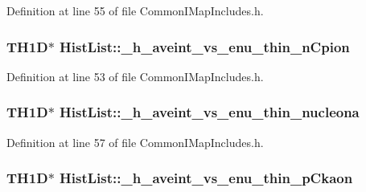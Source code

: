 Definition at line 55 of file Common\-I\-Map\-Includes.\-h.

\hypertarget{struct_hist_list_a1c7c4497fe5ab73f72bcb1c91a6a7d61}{
\subsubsection[{\-\_\-h\-\_\-aveint\-\_\-vs\-\_\-enu\-\_\-thin\-\_\-n\-Cpion}]{\setlength{\rightskip}{0pt plus 5cm}T\-H1\-D$\ast$ Hist\-List\-::\-\_\-h\-\_\-aveint\-\_\-vs\-\_\-enu\-\_\-thin\-\_\-n\-Cpion}}\label{struct_hist_list_a1c7c4497fe5ab73f72bcb1c91a6a7d61}


Definition at line 53 of file Common\-I\-Map\-Includes.\-h.

\hypertarget{struct_hist_list_a3927ab6a626b3f0bcf869619802bab7b}{
\subsubsection[{\-\_\-h\-\_\-aveint\-\_\-vs\-\_\-enu\-\_\-thin\-\_\-nucleona}]{\setlength{\rightskip}{0pt plus 5cm}T\-H1\-D$\ast$ Hist\-List\-::\-\_\-h\-\_\-aveint\-\_\-vs\-\_\-enu\-\_\-thin\-\_\-nucleona}}\label{struct_hist_list_a3927ab6a626b3f0bcf869619802bab7b}


Definition at line 57 of file Common\-I\-Map\-Includes.\-h.

\hypertarget{struct_hist_list_ad649e99463708c708116b66f69fb2cb3}{
\subsubsection[{\-\_\-h\-\_\-aveint\-\_\-vs\-\_\-enu\-\_\-thin\-\_\-p\-Ckaon}]{\setlength{\rightskip}{0pt plus 5cm}T\-H1\-D$\ast$ Hist\-List\-::\-\_\-h\-\_\-aveint\-\_\-vs\-\_\-enu\-\_\-thin\-\_\-p\-Ckaon}}\label{struct_hist_list_ad649e99463708c708116b66f69fb2cb3}


